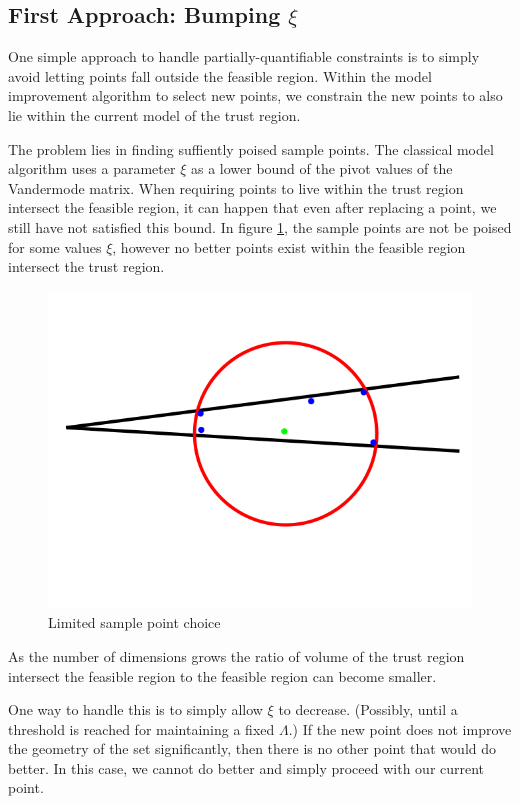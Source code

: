 \subsection{First Approach: Bumping $\xi$}
One simple approach to handle partially-quantifiable constraints is to simply avoid letting points fall outside the feasible region.
Within the model improvement algorithm to select new points, we constrain the new points to also lie within the current model of the trust region.

The problem lies in finding suffiently poised sample points.
The classical model algorithm uses a parameter $\xi$ as a lower bound of the pivot values of the Vandermode matrix.
When requiring points to live within the trust region intersect the feasible region, it can happen that even after replacing a point, we still have not satisfied this bound.
In figure \ref{lspc}, the sample points are not be poised for some values $\xi$, however no better points exist within the feasible region intersect the trust region.

\begin{figure}[h]
    \centering
    \includegraphics[scale=0.4]{images/bad_lambda.png}
    \caption{Limited sample point choice}
    \label{lspc}
\end{figure}

As the number of dimensions grows the ratio of volume of the trust region intersect the feasible region to the feasible region can become smaller.

One way to handle this is to simply allow $\xi$ to decrease. (Possibly, until a threshold is reached for maintaining a fixed $\Lambda$.)
If the new point does not improve the geometry of the set significantly, then there is no other point that would do better.
In this case, we cannot do better and simply proceed with our current point.



